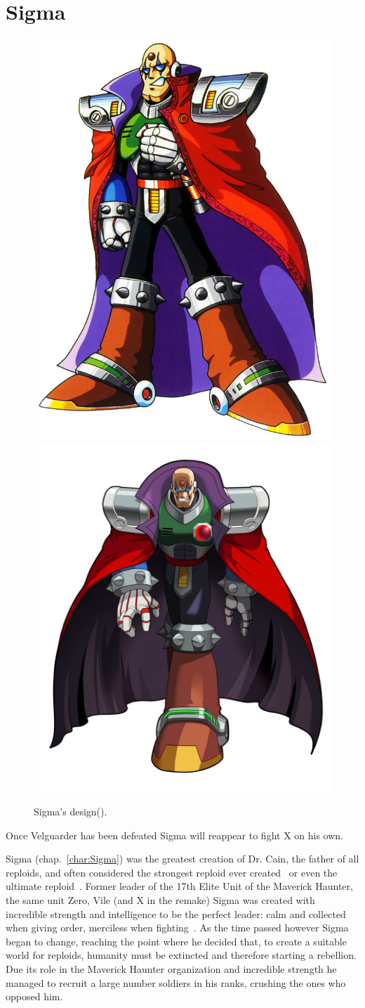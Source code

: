 \section{Sigma}\label{boss:Sigma_x1}
\begin{figure}[htp]
	\centering
	\includegraphics[width=0.4\linewidth]{figures/X1/Sigma_stages/Sigma.jpg}
	\includegraphics[width=0.5\linewidth]{figures/X1/Sigma_stages/MHXSigma.jpg}
	\caption{Sigma's design(\cite{book:MMX_Complete_art}).}
\end{figure}
Once Velguarder has been defeated Sigma will reappear to fight X on his own.

Sigma (chap.~\ref{char:Sigma}) was the greatest creation of Dr. Cain, the father of all reploids, and often considered the strongest reploid ever created~\cite{wayback:X_resources} or even the ultimate reploid~\cite{MHX:manual}. Former leader of the 17th Elite Unit of the Maverick Haunter, the same unit Zero, Vile (and X in the remake) Sigma was created with incredible strength and intelligence  to be the perfect leader: calm and collected when giving order, merciless when fighting~\cite{Xcoll1:Manual_X1}. As the time passed however Sigma began to change, reaching the point where he decided that, to create a suitable world for reploids, humanity must be extincted and therefore starting a rebellion. Due its role in the Maverick Haunter organization and incredible strength he managed to recruit a large number soldiers in his ranks, crushing the ones who opposed him. 

